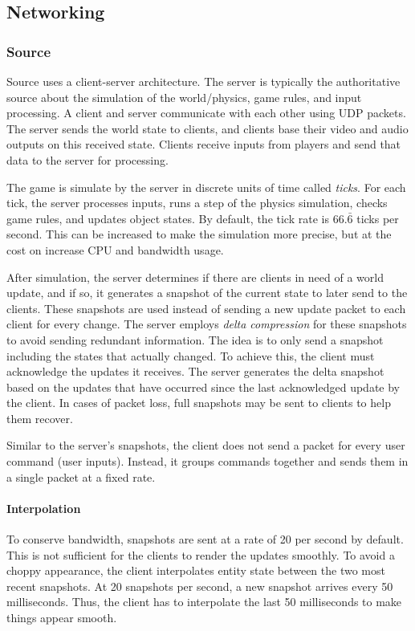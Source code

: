\documentclass[a4paper, 12pt]{scrartcl}
\begin{document}
\subsection{Networking}
\subsubsection{Source}
Source uses a client-server architecture. The server is typically the authoritative source about the simulation of the world/physics, game rules, and input processing. A client and server communicate with each other using UDP packets. The server sends the world state to clients, and clients base their video and audio outputs on this received state. Clients receive inputs from players and send that data to the server for processing.

The game is simulate by the server in discrete units of time called \textit{ticks}. For each tick, the server processes inputs, runs a step of the physics simulation, checks game rules, and updates object states. By default, the tick rate is $66.\bar6$ ticks per second. This can be increased to make the simulation more precise, but at the cost on increase CPU and bandwidth usage.

After simulation, the server determines if there are clients in need of a world update, and if so, it generates a snapshot of the current state to later send to the clients. These snapshots are used instead of sending a new update packet to each client for every change. The server employs \textit{delta compression} for these snapshots to avoid sending redundant information. The idea is to only send a snapshot including the states that actually changed. To achieve this, the client must acknowledge the updates it receives. The server generates the delta snapshot based on the updates that have occurred since the last acknowledged update by the client. In cases of packet loss, full snapshots may be sent to clients to help them recover.

Similar to the server's snapshots, the client does not send a packet for every user command (user inputs). Instead, it groups commands together and sends them in a single packet at a fixed rate.

\paragraph{Interpolation}
To conserve bandwidth, snapshots are sent at a rate of 20 per second by default. This is not sufficient for the clients to render the updates smoothly. To avoid a choppy appearance, the client interpolates entity state between the two most recent snapshots. At 20 snapshots per second, a new snapshot arrives every 50 milliseconds. Thus, the client has to interpolate the last 50 milliseconds to make things appear smooth.
\end{document}
